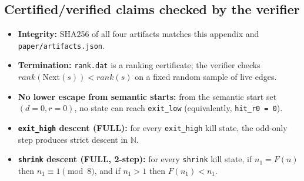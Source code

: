 \subsection*{Certified/verified claims checked by the verifier}

\begin{itemize}
  \item \textbf{Integrity:} SHA256 of all four artifacts matches this appendix and \texttt{paper/artifacts.json}.
  \item \textbf{Termination:} \texttt{rank.dat} is a ranking certificate; the verifier checks
        $rank(\mathrm{Next}(s)) < rank(s)$ on a fixed random sample of live edges.
  \item \textbf{No lower escape from semantic starts:} from the semantic start set $(d=0,r=0)$, no state can reach
        \texttt{exit\_low} (equivalently, \texttt{hit\_r0 = 0}).
  \item \textbf{\texttt{exit\_high} descent (FULL):} for every \texttt{exit\_high} kill state, the odd-only step
        produces strict descent in $\mathbb{N}$.
  \item \textbf{\texttt{shrink} descent (FULL, 2-step):} for every \texttt{shrink} kill state, if $n_1=F(n)$ then
        $n_1\equiv 1\pmod 8$, and if $n_1>1$ then $F(n_1)<n_1$.
\end{itemize}
